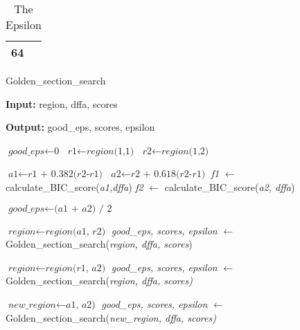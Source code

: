 \documentclass[
a4paper,     %
12pt         %
]{scrartcl}  %
\begin{document}
\begin{table}[ht!]
\centering
\begin{tabular}{|l|}
\hline
64 \\ \hline
\end{tabular}
\caption{The Epsilon}
\label{table:goodepsilon}
\end{table}

\begin{algorithm}[H]
\caption{Golden\_section\_search}\label{alg:goldensection}
\begin{algorithmic}[1]
\item \textbf{Input:} region, dffa, scores
\item \textbf{Output:} good\_eps, scores, epsilon

\State $\textit{good\_eps} \gets \textit{0}$
\State $\textit{r1} \gets \textit{region(1,1)}$
\State $\textit{r2} \gets \textit{region(1,2)}$

       
       \State $\textit{a1} \gets \textit{r1 + 0.382(r2-r1)}$ \label{golden:calcratio}
       \State $\textit{a2} \gets \textit{r2 + 0.618(r2-r1)}$ \label{golden:calcratio2}
       \State \textit{f1} $\gets$ calculate\_BIC\_score(\textit{a1,dffa}) \label{golden:bicscore}
       \State \textit{f2} $\gets$ calculate\_BIC\_score(\textit{a2, dffa}) \label{golden:bicscore2}
       
          \label{golden:condition}
       \State $\textit{good\_eps} \gets \textit{(a1 + a2) / 2}$   \label{golden:average}
        \State \Return
       \EndIf      
       
        \State $\textit{region} \gets \textit{region(a1, r2)}$
        \State \textit{good\_eps, scores, epsilon} $\gets$ Golden\_section\_search(\textit{region, dffa, scores})
       \State \Return
       
        \State $\textit{region} \gets \textit{region(r1, a2)}$
        \State \textit{good\_eps, scores, epsilon} $\gets$ Golden\_section\_search(\textit{region, dffa, scores)}
        \State \Return
       
      \Else 
          \label{golden:limit}
        \State \Return
        \EndIf
      
          \label{golden:maxscores}
        \State $\textit{new\_region} \gets \textit{a1, a2)}$
        \State \textit{good\_eps, scores, epsilon} $\gets$ Golden\_section\_search(\textit{new\_region, dffa, scores)}
        \State \Return
        

\end{algorithmic}
\end{algorithm}
\end{document}
